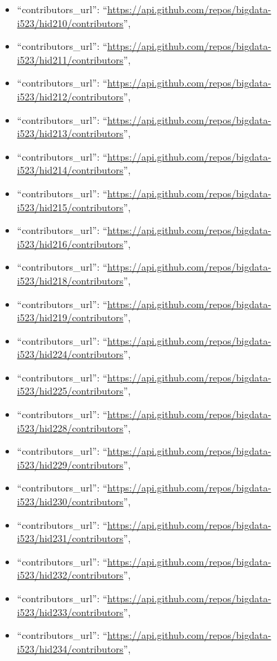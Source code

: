 \begin{itemize}
\item
  ``contributors\_url'':
  ``\url{https://api.github.com/repos/bigdata-i523/hid210/contributors}'',
\item
  ``contributors\_url'':
  ``\url{https://api.github.com/repos/bigdata-i523/hid211/contributors}'',
\item
  ``contributors\_url'':
  ``\url{https://api.github.com/repos/bigdata-i523/hid212/contributors}'',
\item
  ``contributors\_url'':
  ``\url{https://api.github.com/repos/bigdata-i523/hid213/contributors}'',
\item
  ``contributors\_url'':
  ``\url{https://api.github.com/repos/bigdata-i523/hid214/contributors}'',
\item
  ``contributors\_url'':
  ``\url{https://api.github.com/repos/bigdata-i523/hid215/contributors}'',
\item
  ``contributors\_url'':
  ``\url{https://api.github.com/repos/bigdata-i523/hid216/contributors}'',
\item
  ``contributors\_url'':
  ``\url{https://api.github.com/repos/bigdata-i523/hid218/contributors}'',
\item
  ``contributors\_url'':
  ``\url{https://api.github.com/repos/bigdata-i523/hid219/contributors}'',
\item
  ``contributors\_url'':
  ``\url{https://api.github.com/repos/bigdata-i523/hid224/contributors}'',
\item
  ``contributors\_url'':
  ``\url{https://api.github.com/repos/bigdata-i523/hid225/contributors}'',
\item
  ``contributors\_url'':
  ``\url{https://api.github.com/repos/bigdata-i523/hid228/contributors}'',
\item
  ``contributors\_url'':
  ``\url{https://api.github.com/repos/bigdata-i523/hid229/contributors}'',
\item
  ``contributors\_url'':
  ``\url{https://api.github.com/repos/bigdata-i523/hid230/contributors}'',
\item
  ``contributors\_url'':
  ``\url{https://api.github.com/repos/bigdata-i523/hid231/contributors}'',
\item
  ``contributors\_url'':
  ``\url{https://api.github.com/repos/bigdata-i523/hid232/contributors}'',
\item
  ``contributors\_url'':
  ``\url{https://api.github.com/repos/bigdata-i523/hid233/contributors}'',
\item
  ``contributors\_url'':
  ``\url{https://api.github.com/repos/bigdata-i523/hid234/contributors}'',

\end{itemize}
